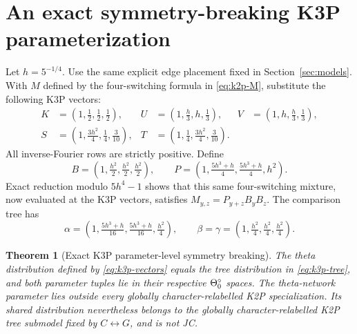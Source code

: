 \documentclass[11pt]{article}
\newtheorem{theorem}{Theorem}\newtheorem{proposition}[theorem]{Proposition}\newtheorem{lemma}[theorem]{Lemma}\newtheorem{corollary}[theorem]{Corollary}
\theoremstyle{remark}\newtheorem{remark}[theorem]{Remark}
\begin{document}
\section{An exact symmetry-breaking K3P parameterization}\label{sec:k3p}
Let $h=5^{-1/4}$. Use the same explicit edge placement fixed in Section~\ref{sec:models}. With $M$ defined by the four-switching formula in \eqref{eq:k2p-M}, substitute the following K3P vectors:
\begin{equation}\label{eq:k3p-vectors}
\begin{aligned}
K&=(1,\tfrac12,\tfrac12,\tfrac12),&U&=(1,\tfrac h3,h,\tfrac13),&V&=(1,h,\tfrac h3,\tfrac13),\\
S&=(1,\tfrac{3h^2}{4},\tfrac14,\tfrac3{10}),&T&=(1,\tfrac14,\tfrac{3h^2}{4},\tfrac3{10}).
\end{aligned}
\end{equation}
All inverse-Fourier rows are strictly positive. Define
\begin{equation}\label{eq:k3p-PB}B=(1,\tfrac{h^2}{2},\tfrac{h^2}{2},\tfrac{h^2}{2}),\qquad P=(1,\tfrac{5h^3+h}{4},\tfrac{5h^3+h}{4},h^2).\end{equation}
Exact reduction modulo $5h^4-1$ shows that this same four-switching mixture, now evaluated at the K3P vectors, satisfies $M_{y,z}=P_{y+z}B_yB_z$. The comparison tree has
\begin{equation}\label{eq:k3p-tree}
\alpha=(1,\tfrac{5h^3+h}{16},\tfrac{5h^3+h}{16},\tfrac{h^2}{4}),\qquad \beta=\gamma=(1,\tfrac{h^2}{4},\tfrac{h^2}{4},\tfrac{h^2}{4}).
\end{equation}
\begin{theorem}[Exact K3P parameter-level symmetry breaking]\label{thm:k3p}
The theta distribution defined by \eqref{eq:k3p-vectors} equals the tree distribution in \eqref{eq:k3p-tree}, and both parameter tuples lie in their respective $\Theta_0^\circ$ spaces. The theta-network parameter lies outside every globally character-relabelled K2P specialization. Its shared distribution nevertheless belongs to the globally character-relabelled K2P tree submodel fixed by $C\leftrightarrow G$, and is not JC.
\end{theorem}
\end{document}
